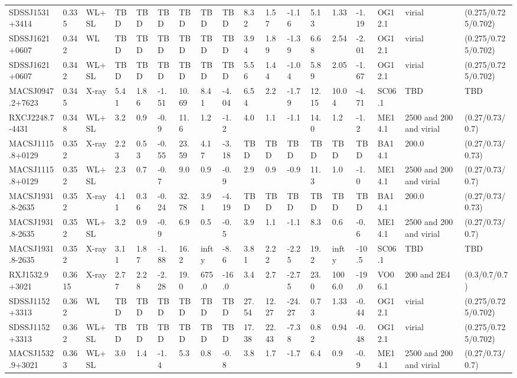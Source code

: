 \documentclass{article}
\begin{document}
\begin{center}
\begin{landscape}
\begin{longtable}{llllllllllllllllll}
SDSSJ1531+3414 & 0.335 & WL+SL & TBD & TBD & TBD & TBD & TBD & TBD & 8.32 & 1.57 & -1.16 & 5.13 & 1.33 & -1.19 & OG12.1 & virial & (0.275/0.725/0.702) \\
SDSSJ1621+0607 & 0.342 & WL & TBD & TBD & TBD & TBD & TBD & TBD & 3.94 & 1.89 & -1.39 & 6.68 & 2.54 & -2.01 & OG12.1 & virial & (0.275/0.725/0.702) \\
SDSSJ1621+0607 & 0.342 & WL+SL & TBD & TBD & TBD & TBD & TBD & TBD & 5.56 & 1.44 & -1.04 & 5.89 & 2.05 & -1.67 & OG12.1 & virial & (0.275/0.725/0.702) \\
MACSJ0947.2+7623 & 0.345 & X-ray & 5.41 & 1.86 & -1.51 & 10.69 & 8.41 & -4.04 & 6.54 & 2.2 & -1.79 & 12.15 & 10.04 & -4.71 & SC06.1 & TBD & TBD \\
RXCJ2248.7-4431 & 0.348 & WL+SL & 3.2 & 0.9 & -0.9 & 11.6 & 1.2 & -1.2 & 4.0 & 1.1 & -1.1 & 14.0 & 1.2 & -1.2 & ME14.1 & 2500 and 200 and virial & (0.27/0.73/0.7) \\
MACSJ1115.8+0129 & 0.352 & X-ray & 2.23 & 0.53 & -0.55 & 23.59 & 4.17 & -3.18 & TBD & TBD & TBD & TBD & TBD & TBD & BA14.1 & 200.0 & (0.27/0.73/0.73) \\
MACSJ1115.8+0129 & 0.352 & WL+SL & 2.3 & 0.7 & -0.7 & 9.0 & 0.9 & -0.9 & 2.9 & 0.9 & -0.9 & 11.3 & 1.0 & -1.0 & ME14.1 & 2500 and 200 and virial & (0.27/0.73/0.7) \\
MACSJ1931.8-2635 & 0.352 & X-ray & 4.11 & 0.36 & -0.24 & 32.78 & 3.91 & -4.19 & TBD & TBD & TBD & TBD & TBD & TBD & BA14.1 & 200.0 & (0.27/0.73/0.73) \\
MACSJ1931.8-2635 & 0.352 & WL+SL & 3.2 & 0.9 & -0.9 & 6.9 & 0.5 & -0.5 & 3.9 & 1.1 & -1.1 & 8.3 & 0.6 & -0.6 & ME14.1 & 2500 and 200 and virial & (0.27/0.73/0.7) \\
MACSJ1931.8-2635 & 0.352 & X-ray & 3.11 & 1.87 & -1.88 & 16.2 & infty & -8.6 & 3.81 & 2.22 & -2.25 & 19.2 & infty & -10.5 & SC06.1 & TBD & TBD \\
RXJ1532.9+3021 & 0.3615 & X-ray & 2.77 & 2.28 & -2.28 & 19.0 & 675.0 & -16.0 & 3.4 & 2.7 & -2.75 & 23.0 & 1006.0 & -19.0 & VO06.1 & 200 and 2E4 & (0.3/0.7/0.7) \\
SDSSJ1152+3313 & 0.362 & WL & TBD & TBD & TBD & TBD & TBD & TBD & 27.54 & 12.27 & -24.27 & 0.73 & 1.33 & -0.44 & OG12.1 & virial & (0.275/0.725/0.702) \\
SDSSJ1152+3313 & 0.362 & WL+SL & TBD & TBD & TBD & TBD & TBD & TBD & 17.38 & 22.43 & -7.38 & 0.82 & 0.94 & -0.48 & OG12.1 & virial & (0.275/0.725/0.702) \\
MACSJ1532.9+3021 & 0.363 & WL+SL & 3.0 & 1.4 & -1.4 & 5.3 & 0.8 & -0.8 & 3.8 & 1.7 & -1.7 & 6.4 & 0.9 & -0.9 & ME14.1 & 2500 and 200 and virial & (0.27/0.73/0.7) \\

\end{longtable}
\end{landscape}
\end{center}
\end{document}
